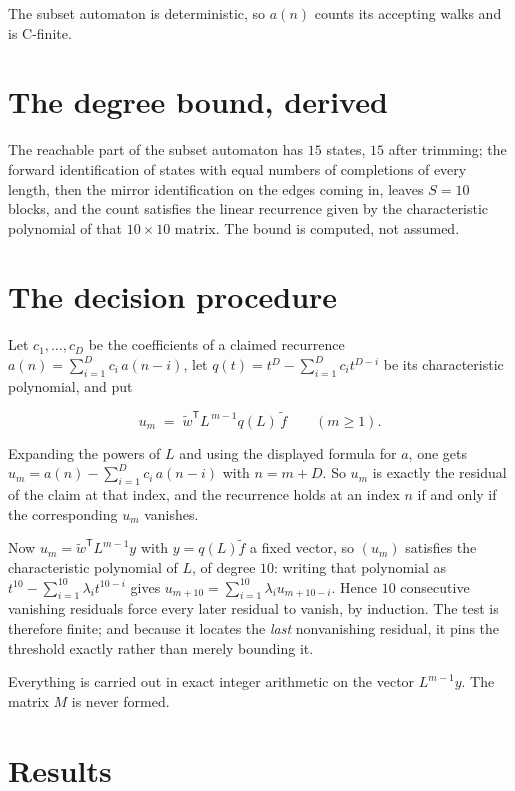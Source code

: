 \documentclass[11pt]{article}
\theoremstyle{definition}
\begin{document}
The subset automaton is deterministic, so $a(n)$ counts its accepting walks and is C-finite.

\section{The degree bound, derived}

The reachable part of the subset automaton has $15$ states, $15$ after trimming; the forward identification of states with equal numbers of completions of every length, then the mirror identification on the edges coming in, leaves $S = 10$ blocks, and the count satisfies the linear recurrence given by the characteristic polynomial of that $10\times10$ matrix. The bound is computed, not assumed.

\section{The decision procedure}

Let $c_1,\dots,c_D$ be the coefficients of a claimed recurrence $a(n) = \sum_{i=1}^{D} c_i\,a(n-i)$, let $q(t) = t^{D} - \sum_{i=1}^{D} c_i t^{D-i}$ be its characteristic polynomial, and put

\[u_m \;=\; \tilde w^{\mathsf T} L^{\,m-1} q(L)\,\tilde f \qquad (m \ge 1).\]

Expanding the powers of $L$ and using the displayed formula for $a$, one gets $u_m = a(n) - \sum_{i=1}^{D} c_i\,a(n-i)$ with $n = m + D$. So $u_m$ is exactly the residual of the claim at that index, and the recurrence holds at an index $n$ if and only if the corresponding $u_m$ vanishes.

Now $u_m = \tilde w^{\mathsf T} L^{m-1} y$ with $y = q(L)\tilde f$ a fixed vector, so $(u_m)$ satisfies the characteristic polynomial of $L$, of degree $10$: writing that polynomial as $t^{10} - \sum_{i=1}^{10} \lambda_i t^{10-i}$ gives $u_{m+10} = \sum_{i=1}^{10} \lambda_i u_{m+10-i}$. Hence $10$ consecutive vanishing residuals force every later residual to vanish, by induction. The test is therefore finite; and because it locates the {\itshape last} nonvanishing residual, it pins the threshold exactly rather than merely bounding it.

Everything is carried out in exact integer arithmetic on the vector $L^{m-1}y$. The matrix $M$ is never formed.

\section{Results}
\end{document}
